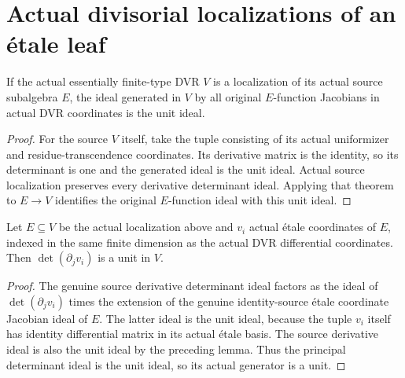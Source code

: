 \section{Actual divisorial localizations of an \'etale leaf}

\begin{lemma}\label{lem:sc0-dvr-source-localization-unit-jacobian}
\leanok
{}
If the actual essentially finite-type DVR $V$ is a localization of its
actual source subalgebra $E$, the ideal generated in $V$ by all original
$E$-function Jacobians in actual DVR coordinates is the unit ideal.
\end{lemma}
\begin{proof}
For the source $V$ itself, take the tuple consisting of its actual
uniformizer and residue-transcendence coordinates. Its derivative matrix
is the identity, so its determinant is one and the generated ideal is
the unit ideal. Actual source localization preserves every derivative
determinant ideal. Applying that theorem to $E\to V$ identifies the
original $E$-function ideal with this unit ideal.
\end{proof}

\begin{theorem}\label{thm:sc0-dvr-etale-leaf-localization-unit}
\leanok
{}
Let $E\subseteq V$ be the actual localization above and $v_i$ actual
\'etale coordinates of $E$, indexed in the same finite dimension as the
actual DVR differential coordinates. Then
$\det(\partial_jv_i)$ is a unit in $V$.
\end{theorem}
\begin{proof}
The genuine source derivative determinant ideal factors as the ideal
of $\det(\partial_jv_i)$ times the extension of the genuine identity-source
\'etale coordinate Jacobian ideal of $E$. The latter ideal is the unit
ideal, because the tuple $v_i$ itself has identity differential matrix
in its actual \'etale basis. The source derivative ideal is also the
unit ideal by the preceding lemma. Thus the principal determinant ideal
is the unit ideal, so its actual generator is a unit.
\end{proof}


